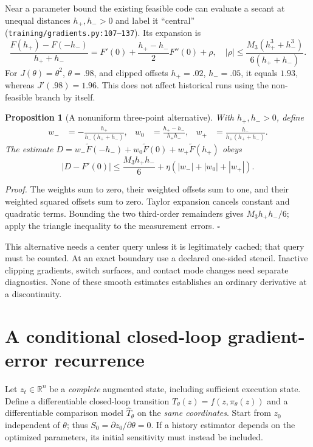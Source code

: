 \documentclass[10pt]{article}
\newtheorem{proposition}{Proposition}
\newenvironment{proof}{\par\noindent\textit{Proof.} }{\hfill$\square$\par}
\newcommand{\R}{\mathbb R}
\begin{document}
Near a parameter bound the existing feasible code can evaluate a secant at unequal distances $h_+,h_->0$ and label it ``central'' (\texttt{training/gradients.py:107--137}). Its expansion is
\begin{equation}
\frac{F(h_+)-F(-h_-)}{h_++h_-}
=F'(0)+\frac{h_+-h_-}{2}F''(0)+\rho,
\quad |\rho|\le\frac{M_3(h_+^3+h_-^3)}{6(h_++h_-)}.
\end{equation}
For $J(\theta)=\theta^2$, $\theta=.98$, and clipped offsets $h_+=.02$, $h_-=.05$, it equals $1.93$, whereas $J'(.98)=1.96$. This does not affect historical runs using the non-feasible branch by itself.

\begin{proposition}[A nonuniform three-point alternative]
With $h_+,h_->0$, define
\begin{align}
w_-&=-\frac{h_+}{h_-(h_++h_-)},&
w_0&=\frac{h_+-h_-}{h_+h_-},&
w_+&=\frac{h_-}{h_+(h_++h_-)}.
\end{align}
The estimate $D=w_-\widetilde F(-h_-)+w_0\widetilde F(0)+w_+\widetilde F(h_+)$ obeys
\begin{equation}
|D-F'(0)|\le \frac{M_3h_+h_-}{6}
+\eta(|w_-|+|w_0|+|w_+|).
\end{equation}
\end{proposition}
\begin{proof}
The weights sum to zero, their weighted offsets sum to one, and their weighted squared offsets sum to zero. Taylor expansion cancels constant and quadratic terms. Bounding the two third-order remainders gives $M_3h_+h_-/6$; apply the triangle inequality to the measurement errors.
\end{proof}
This alternative needs a center query unless it is legitimately cached; that query must be counted. At an exact boundary use a declared one-sided stencil. Inactive clipping gradients, switch surfaces, and contact mode changes need separate diagnostics. None of these smooth estimates establishes an ordinary derivative at a discontinuity.

\section{A conditional closed-loop gradient-error recurrence}
Let $z_t\in\R^n$ be a \emph{complete} augmented state, including sufficient execution state. Define a differentiable closed-loop transition $T_\theta(z)=f(z,\pi_\theta(z))$ and a differentiable comparison model $\hat T_\theta$ on the \emph{same coordinates}. Start from $z_0$ independent of $\theta$; thus $S_0=\partial z_0/\partial\theta=0$. If a history estimator depends on the optimized parameters, its initial sensitivity must instead be included.
\end{document}
